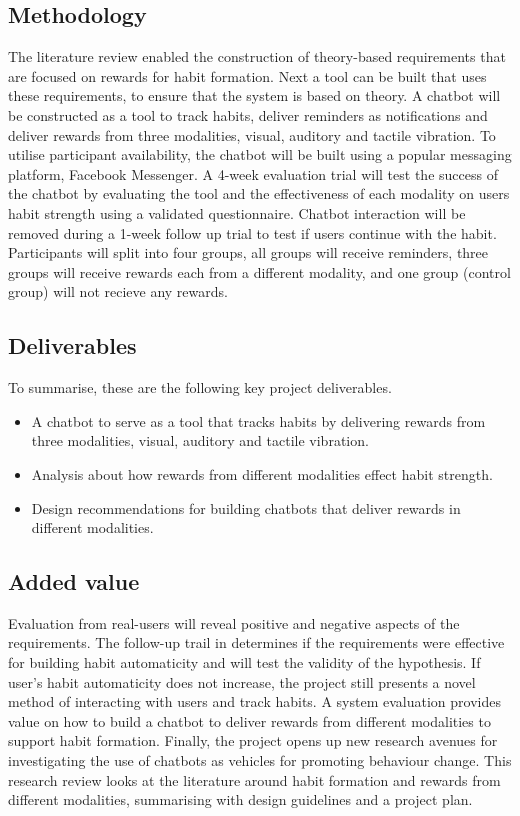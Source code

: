 \subsection*{Methodology}
The literature review enabled the construction of theory-based requirements that are focused on rewards for habit formation. Next a tool can be built that uses these requirements, to ensure that the system is based on theory. A chatbot will be constructed as a tool to track habits, deliver reminders as notifications and deliver rewards from three modalities, visual, auditory and tactile vibration. To utilise participant availability, the chatbot will be built using a popular messaging platform, Facebook Messenger.\newline
\newline
A 4-week evaluation trial will test the success of the chatbot by evaluating the tool and the effectiveness of each modality on users habit strength using a validated questionnaire. Chatbot interaction will be removed during a 1-week follow up trial to test if users continue with the habit. Participants will split into four groups, all groups will receive reminders, three groups will receive rewards each from a different modality, and one group (control group) will not recieve any rewards.

\newpage
\subsection*{Deliverables}
To summarise, these are the following key project deliverables.

\begin{itemize}
  \item A chatbot to serve as a tool that tracks habits by delivering rewards from three modalities, visual, auditory and tactile vibration.
  \item Analysis about how rewards from different modalities effect habit strength.
  \item Design recommendations for building chatbots that deliver rewards in different modalities.
\end{itemize}

\subsection*{Added value}
Evaluation from real-users will reveal positive and negative aspects of the requirements. The follow-up trail in determines if the requirements were effective for building habit automaticity and will test the validity of the hypothesis. If user's habit automaticity does not increase, the project still presents a novel method of interacting with users and track habits. A system evaluation provides value on how to build a chatbot to deliver rewards from different modalities to support habit formation. Finally, the project opens up new research avenues for investigating the use of chatbots as vehicles for promoting behaviour change.\newline
\newline
This research review looks at the literature around habit formation and rewards from different modalities, summarising with design guidelines and a project plan.

\newpage
